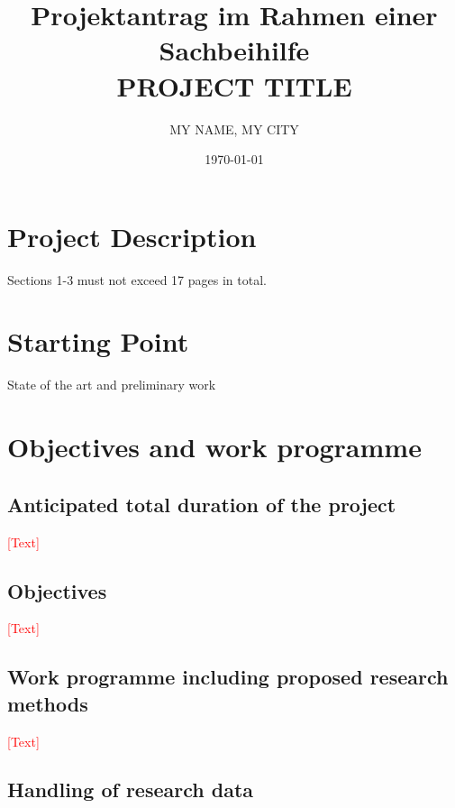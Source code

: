\documentclass[a4paper,11pt]{article}
\begin{document}
\title{{\small Projektantrag im Rahmen einer Sachbeihilfe}\\{\bf \LARGE PROJECT TITLE}}
\author{MY NAME, MY CITY}
\date{\today}

\maketitle



\thispagestyle{empty}

\mbox{}
\vspace{-9ex}

\section*{Project Description}
Sections 1-3 must not exceed 17 pages in total.

\section{Starting Point}

State of the art and preliminary work

\section{Objectives and work programme}

\subsection{Anticipated total duration of the project}

\noindent\textcolor{red}{[Text]}

\subsection{Objectives}

\noindent\textcolor{red}{[Text]}

\subsection{Work programme including proposed research methods}


\noindent\textcolor{red}{[Text]}

\subsection{Handling of research data}
\end{document}
